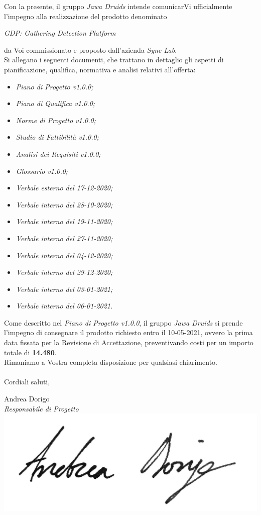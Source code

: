 \documentclass[a4paper,12pt]{report}
\begin{document}
Con la presente, il gruppo \textit{Jawa Druids} intende comunicarVi ufficialmente l’impegno alla realizzazione del prodotto denominato
\begin{center}
  \textit{GDP: Gathering Detection Platform}
\end{center}
da Voi commissionato e proposto dall'azienda \textit{Sync Lab}.
\vspace{1cm}
\\
Si allegano i seguenti documenti, che trattano in dettaglio gli aspetti di pianificazione, qualifica, normativa e analisi relativi all'offerta:
\begin{itemize}
  \item \textit{Piano di Progetto v1.0.0;}
  \item \textit{Piano di Qualifica v1.0.0;}
  \item \textit{Norme di Progetto v1.0.0;}
  \item \textit{Studio di Fattibilità v1.0.0;}
  \item \textit{Analisi dei Requisiti v1.0.0;}
  \item \textit{Glossario v1.0.0;}
  \item \textit{Verbale esterno del 17-12-2020;}
  \item \textit{Verbale interno del 28-10-2020;}
  \item \textit{Verbale interno del 19-11-2020;}
  \item \textit{Verbale interno del 27-11-2020;}
  \item \textit{Verbale interno del 04-12-2020;}
  \item \textit{Verbale interno del 29-12-2020;}
  \item \textit{Verbale interno del 03-01-2021;}
  \item \textit{Verbale interno del 06-01-2021.}
\end{itemize}
\vspace{0.7cm}

Come descritto nel \textit{Piano di Progetto v1.0.0}, il gruppo \textit{Jawa Druids} si prende l’impegno di consegnare il prodotto richiesto entro il 10-05-2021, ovvero la prima data fissata per la Revisione di Accettazione, preventivando costi per un importo totale di \textbf{14.480\texteuro}.\\
Rimaniamo a Vostra completa disposizione per qualsiasi chiarimento.\\
\vspace{0.3cm}
\\
Cordiali saluti,
\begin{flushright}
  Andrea Dorigo \\
  \textit{Responsabile di Progetto} \\
  \includegraphics[width=0.3\linewidth]{immagini/firme/andrea_dorigo.jpg}\\[4ex]
\end{flushright}
\end{document}
